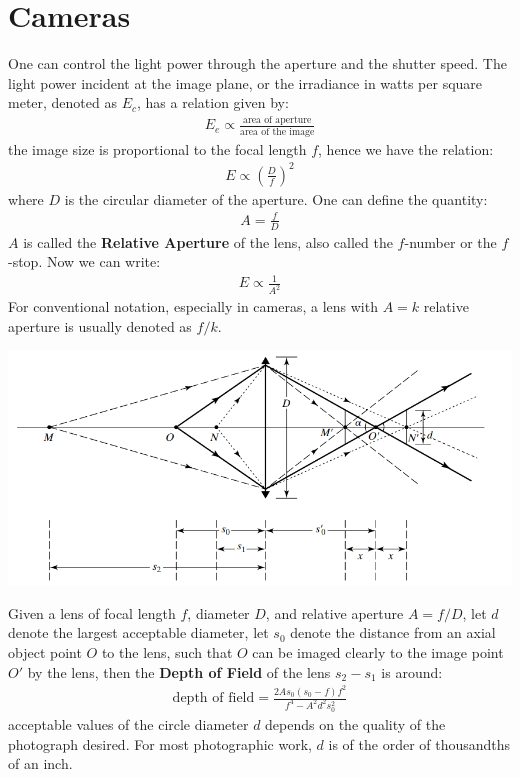 \documentclass[11pt]{book}
\theoremstyle{break}
\theoremstyle{break}
\begin{document}
\newpage
\section[Cameras]{\color{red} Cameras\color{black}}
One can control the light power through the aperture and the shutter speed. The light power incident at the image plane, or the irradiance in watts per square meter, denoted as $E_c$, has a relation given by:
\begin{align*}
E_e \propto \frac{\text{area of aperture}}{\text{area of the image}}
\end{align*}
the image size is proportional to the focal length $f$, hence we have the relation:
\begin{align*}
E\propto \left(\frac{D}{f} \right)^2
\end{align*}
where $D$ is the circular diameter of the aperture. One can define the quantity:
\begin{align*}
A = \frac{f}{D}
\end{align*}
$A$ is called the \textbf{Relative Aperture} of the lens, also called the $f$-number or the $f$-stop. Now we can write:
\begin{align*}
E \propto \frac{1}{A^2}
\end{align*}
For conventional notation, especially in cameras, a lens with $A=k$ relative aperture is usually denoted as $f/k$.\\


\begin{center}
\includegraphics[scale=0.69]{dof.png}
\end{center}
Given a lens of focal length $f$, diameter $D$, and relative aperture $A = f/D$, let $d$ denote the largest acceptable diameter, let $s_0$ denote the distance from an axial object point $O$ to the lens, such that $O$ can be imaged clearly to the image point $O'$ by the lens, then the \textbf{Depth of Field} of the lens $s_2-s_1$ is around:
\begin{align*}
\text{depth of field} = \frac{2A s_0(s_0 - f)f^2}{f^4 - A^2 d^2 s_0^2}
\end{align*}
acceptable values of the circle diameter $d$ depends on the quality of the photograph desired. For most photographic work, $d$ is of the order of thousandths of an inch.\\
\end{document}
